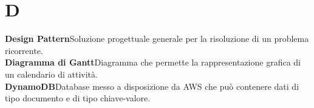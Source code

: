 \newpage
\section{D}\label{l:D}
\textbf{Design Pattern}\newline Soluzione progettuale generale per la risoluzione di un problema ricorrente.\\
\newline
\textbf{Diagramma di Gantt}\newline Diagramma che permette la rappresentazione grafica di un calendario di attività.\\
\newline
\textbf{DynamoDB}\newline Database messo a disposizione da AWS che può contenere dati di tipo documento e di tipo chiave-valore.